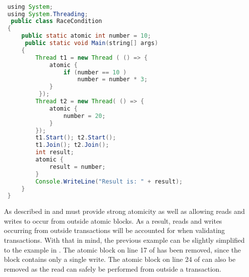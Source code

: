 \begin{lstlisting}[label=lst:stm_atomic_syntax,
 caption={Transaction Syntax},
 language=Java, 
 showspaces=false,
 showtabs=false,
 breaklines=true,
 showstringspaces=false,
 breakatwhitespace=true,
 commentstyle=\color{greencomments},
 keywordstyle=\color{bluekeywords},
 stringstyle=\color{redstrings},
 morekeywords={atomic, retry, orElse, var, get, set, using}]  % Start your code-block

 using System;
 using System.Threading;
  public class RaceCondition
 {
     public static atomic int number = 10;
      public static void Main(string[] args)
     {
         Thread t1 = new Thread ( () => {
             atomic {
                 if (number == 10 )          
                     number = number * 3;
             }
          });
         Thread t2 = new Thread( () => {
             atomic {
                 number = 20;
             }
         });
         t1.Start(); t2.Start();
         t1.Join(); t2.Join();
         int result;
         atomic {
             result = number;         
         }
         Console.WriteLine("Result is: " + result);
     }
 }
\end{lstlisting}

As described in  and  \stmnamesp must provide strong atomicity as well as allowing reads and writes to occur from outside atomic blocks. As a result, reads and writes occurring from outside transactions will be accounted for when validating transactions. With that in mind, the previous example can be slightly simplified to the example in . The atomic block on line 17 of  has been removed, since the  block contains only a single write. The atomic block on line 24 of  can also be removed as the read can safely be performed from outside a transaction.

